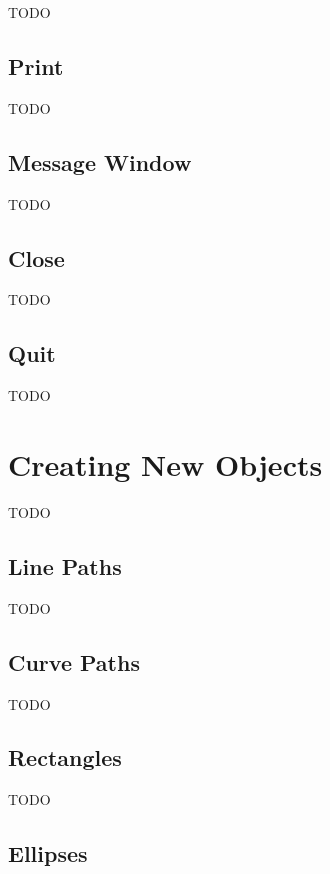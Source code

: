 TODO


\section{Print}\label{sec:print}

TODO


\section{Message Window}\label{sec:messages}

TODO


\section{Close}\label{sec:closeimage}

TODO


\section{Quit}\label{sec:quit}

TODO


\chapter{Creating New Objects}\label{sec:newobjects}

TODO

\section{Line Paths}\label{sec:newlinepath}

TODO

\section{Curve Paths}\label{sec:newcurvepath}

TODO


\section{Rectangles}\label{sec:rectangles}

TODO


\section{Ellipses}\label{sec:ellipses}

